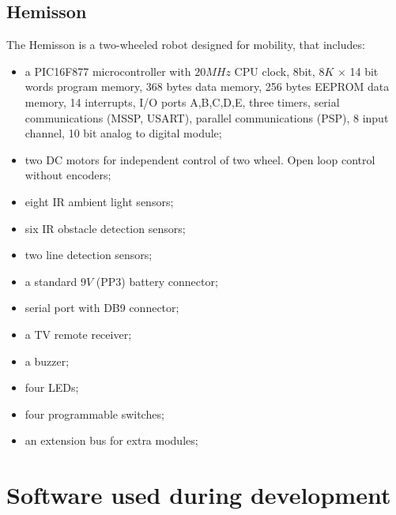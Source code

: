 \documentclass[a4paper,10pt]{article} %
\begin{document}

\subsection{Hemisson} %
\label{sub:Hemisson}

The Hemisson is a two-wheeled robot designed for mobility, that includes:
\begin{itemize}
    \item a PIC16F877 microcontroller with $20MHz$ CPU clock, 8bit,
    $8K$ $\times$ 14 bit words program memory, 368 bytes data memory, 256 bytes
    EEPROM data memory, 14 interrupts, I/O ports A,B,C,D,E, three timers,
    serial communications (MSSP, USART), parallel communications (PSP), 8
    input channel, 10 bit analog to digital module;
    \item two DC motors for independent control of two wheel. Open loop
    control without encoders;
    \item eight IR ambient light sensors;
    \item six IR obstacle detection sensors;
    \item two line detection sensors;
    \item a standard $9V$ (PP3) battery connector;
    \item serial port with DB9 connector;
    \item a TV remote receiver;
    \item a buzzer;
    \item four LEDs;
    \item four programmable switches;
    \item an extension bus for extra modules;
\end{itemize}



\section{Software used during development} %
\label{app:robot-software}
\end{document}
